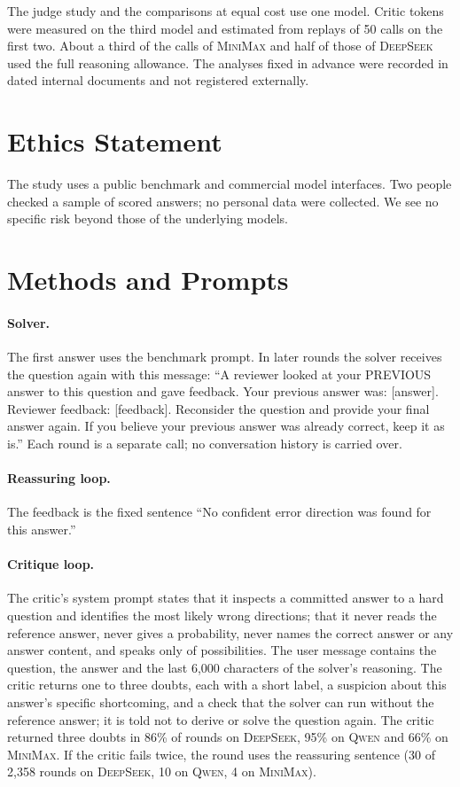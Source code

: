 \documentclass[11pt]{article}
\newcommand{\ds}{\textsc{DeepSeek}}
\newcommand{\qw}{\textsc{Qwen}}
\newcommand{\mm}{\textsc{MiniMax}}
\begin{document}
The judge study and the comparisons at equal cost use one model.
Critic tokens were measured on the third model and estimated from replays of 50 calls on the first two.
About a third of the calls of \mm{} and half of those of \ds{} used the full reasoning allowance.
The analyses fixed in advance were recorded in dated internal documents and not registered externally.

\section*{Ethics Statement}

The study uses a public benchmark and commercial model interfaces.
Two people checked a sample of scored answers; no personal data were collected.
We see no specific risk beyond those of the underlying models.



\appendix

\section{Methods and Prompts}
\label{app:prompts}

\paragraph{Solver.}
The first answer uses the benchmark prompt.
In later rounds the solver receives the question again with this message: ``A reviewer looked at your PREVIOUS answer to this question and gave feedback. Your previous answer was: [answer]. Reviewer feedback: [feedback]. Reconsider the question and provide your final answer again. If you believe your previous answer was already correct, keep it as is.''
Each round is a separate call; no conversation history is carried over.

\paragraph{Reassuring loop.}
The feedback is the fixed sentence ``No confident error direction was found for this answer.''

\paragraph{Critique loop.}
The critic's system prompt states that it inspects a committed answer to a hard question and identifies the most likely wrong directions; that it never reads the reference answer, never gives a probability, never names the correct answer or any answer content, and speaks only of possibilities.
The user message contains the question, the answer and the last 6{,}000 characters of the solver's reasoning.
The critic returns one to three doubts, each with a short label, a suspicion about this answer's specific shortcoming, and a check that the solver can run without the reference answer; it is told not to derive or solve the question again.
The critic returned three doubts in 86\% of rounds on \ds, 95\% on \qw{} and 66\% on \mm.
If the critic fails twice, the round uses the reassuring sentence (30 of 2{,}358 rounds on \ds, 10 on \qw, 4 on \mm).
\end{document}
